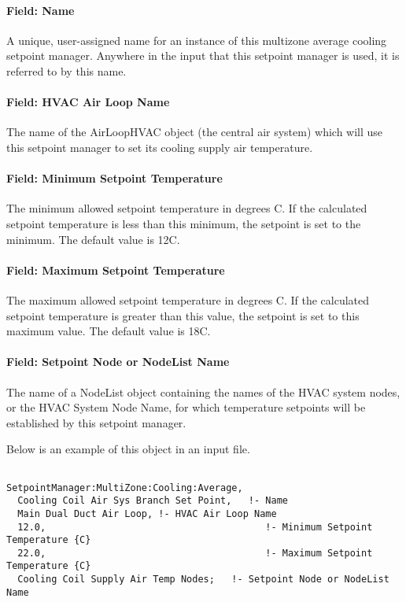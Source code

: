 \paragraph{Field: Name}\label{field-name-14-008}

A unique, user-assigned name for an instance of this multizone average cooling setpoint manager. Anywhere in the input that this setpoint manager is used, it is referred to by this name.

\paragraph{Field: HVAC Air Loop Name}\label{field-hvac-air-loop-name-4}

The name of the AirLoopHVAC object (the central air system) which will use this setpoint manager to set its cooling supply air temperature.

\paragraph{Field: Minimum Setpoint Temperature}\label{field-minimum-setpoint-temperature-4}

The minimum allowed setpoint temperature in degrees C. If the calculated setpoint temperature is less than this minimum, the setpoint is set to the minimum. The default value is 12C.

\paragraph{Field: Maximum Setpoint Temperature}\label{field-maximum-setpoint-temperature-4}

The maximum allowed setpoint temperature in degrees C. If the calculated setpoint temperature is greater than this value, the setpoint is set to this maximum value. The default value is 18C.

\paragraph{Field: Setpoint Node or NodeList Name}\label{field-setpoint-node-or-nodelist-name-13}

The name of a NodeList object containing the names of the HVAC system nodes, or the HVAC System Node Name, for which temperature setpoints will be established by this setpoint manager.

Below is an example of this object in an input file.

\begin{lstlisting}

SetpointManager:MultiZone:Cooling:Average,
  Cooling Coil Air Sys Branch Set Point,   !- Name
  Main Dual Duct Air Loop, !- HVAC Air Loop Name
  12.0,                                       !- Minimum Setpoint Temperature {C}
  22.0,                                       !- Maximum Setpoint Temperature {C}
  Cooling Coil Supply Air Temp Nodes;   !- Setpoint Node or NodeList Name
\end{lstlisting}

